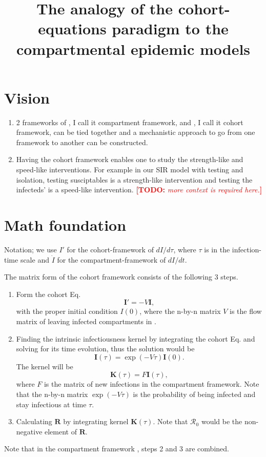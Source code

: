 \documentclass[12pt]{article}
\title{The analogy of the cohort-equations paradigm to the compartmental epidemic models}
\newcommand{\todo}[1]{\comment{red}{TODO}{#1}}
\newcommand{\R}{\ensuremath{\mathcal{R}_0}}
\renewcommand{\vec}[1]{\ensuremath{\mathbf{#1}}} %
\newcommand{\comment}{\showcomment}
\newcommand{\showcomment}[3]{\textcolor{#1}{\textbf{[#2: }\textsl{#3}\textbf{]}}}
\theoremstyle{definition} %
\begin{document}
\maketitle
\linenumbers
\section{Vision}
\begin{enumerate}
\item 2 frameworks of \cite{van2002reproduction}, I call it compartment framework, and \cite{champredon2018equivalence}, I call it cohort framework, can be tied together and a mechanistic approach to go from one framework to another can be constructed.

\item Having the cohort framework enables one to study the strength-like and speed-like interventions. For example in our SIR model with testing and isolation, testing susciptables is a strength-like intervention and testing the infecteds' is a speed-like intervention. \todo{more context is required here.}
\end{enumerate}

\section{Math foundation}
Notation; we use $I'$ for the cohort-framework of $dI/d\tau$, where $\tau$ is in the infection-time scale and $\dot I$ for the compartment-framework of $dI/dt$. 

The matrix form of the cohort framework consists of the following 3 steps.
\begin{enumerate}[{\it Step 1.}]
\item
Form the cohort Eq. 
\begin{equation}
\label{eq:cohort}
\vec I'=-V \vec I,
\end{equation}
 with the proper initial condition $I(0)$, where the n-by-n matrix $V$ is the flow matrix of leaving infected compartments in \cite{van2002reproduction}.

\item 
Finding the intrinsic infectiousness kernel by integrating the cohort Eq. and solving for its time evolution, thus
the solution would be 
\begin{equation}
\label{eq:I}
\vec I(\tau) = \exp(-V\tau) \vec I(0).
\end{equation}
The kernel will be 
\begin{equation}
\label{eq:kernel}
\vec K(\tau) = F \vec I(\tau), 
\end{equation}
where $F$ is the matrix of new infections in the compartment framework.
Note that the n-by-n matrix $\exp(-V\tau)$ is the probability of being infected and stay infectious at time $\tau$. 

\item
Calculating $\vec R$ by integrating kernel $\vec K(\tau)$. Note that $\R$ would be the non-negative element of $\vec R$.
\end{enumerate}
Note that in the compartment framework \citep{van2002reproduction}, steps 2 and 3 are combined.
\end{document}
